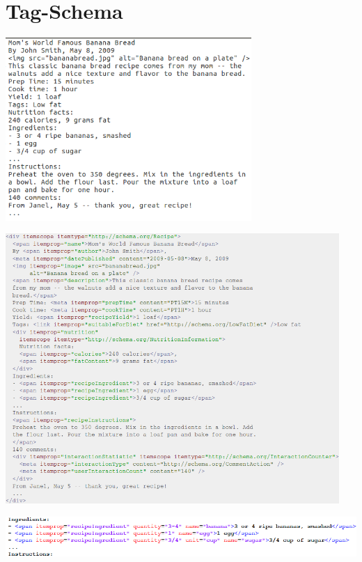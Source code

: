 \documentclass[12pt]{beamer}
\newcommand{\myCite}[1]{{\scriptsize\parencite{#1}}}
\begin{document}
\section{Tag-Schema}
\begin{frame}{}
	\includegraphics[width=0.7\textwidth]{Images/schemaRecipeWithoutMarkup} \\
	\myCite{schemaOrg}
\end{frame}
	
\begin{frame}{}
	\includegraphics[width=0.95\textwidth]{Images/schemaRecipeWithMarkup} \\
	\myCite{schemaOrg}
\end{frame}

\begin{frame}{}
	\includegraphics[width=1\textwidth]{Images/exampleCueML} \\
\end{frame}
\end{document}
